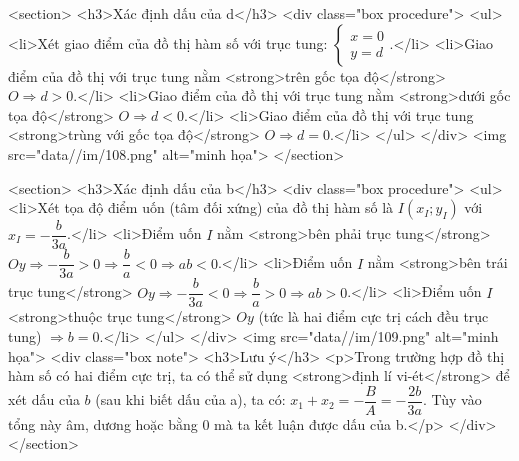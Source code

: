     <section>
        <h3>Xác định dấu của d</h3>
        <div class="box procedure">
            <ul>
                <li>Xét giao điểm của đồ thị hàm số với trục tung: \(\begin{cases} x = 0 \\ y = d \end{cases}\).</li>
                <li>Giao điểm của đồ thị với trục tung nằm <strong>trên gốc tọa độ</strong> \(O \Rightarrow \boxed{d > 0}\).</li>
                <li>Giao điểm của đồ thị với trục tung nằm <strong>dưới gốc tọa độ</strong> \(O \Rightarrow \boxed{d < 0}\).</li>
                <li>Giao điểm của đồ thị với trục tung <strong>trùng với gốc tọa độ</strong> \(O \Rightarrow \boxed{d = 0}\).</li>
            </ul>
        </div>
        <img src="data//im/108.png" alt="minh họa">
    </section>

    <section>
        <h3>Xác định dấu của b</h3>
        <div class="box procedure">
            <ul>
                <li>Xét tọa độ điểm uốn (tâm đối xứng) của đồ thị hàm số là \(I(x_I; y_I)\) với \(x_I = -\dfrac{b}{3a}\).</li>
                <li>Điểm uốn \(I\) nằm <strong>bên phải trục tung</strong> \(Oy \Rightarrow -\dfrac{b}{3a} > 0 \Rightarrow \dfrac{b}{a} < 0 \Rightarrow \boxed{ab < 0}\).</li>
                <li>Điểm uốn \(I\) nằm <strong>bên trái trục tung</strong> \(Oy \Rightarrow -\dfrac{b}{3a} < 0 \Rightarrow \dfrac{b}{a} > 0 \Rightarrow \boxed{ab > 0}\).</li>
                <li>Điểm uốn \(I\) <strong>thuộc trục tung</strong> \(Oy\) (tức là hai điểm cực trị cách đều trục tung) \(\Rightarrow \boxed{b = 0}\).</li>
            </ul>
        </div>
        <img src="data//im/109.png" alt="minh họa">
        <div class="box note">
            <h3>Lưu ý</h3>
            <p>Trong trường hợp đồ thị hàm số có hai điểm cực trị, ta có thể sử dụng <strong>định lí vi-ét</strong> để xét dấu của \(b\) (sau khi biết dấu của a), ta có: \(x_1 + x_2 = -\dfrac{B}{A} = -\dfrac{2b}{3a}\). Tùy vào tổng này âm, dương hoặc bằng 0 mà ta kết luận được dấu của b.</p>
        </div>
    </section>

